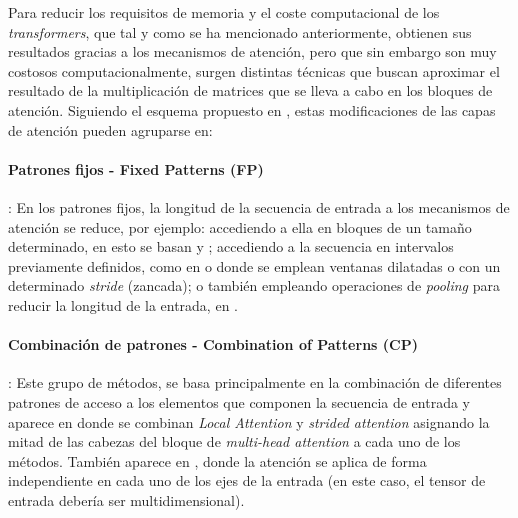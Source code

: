 Para reducir los requisitos de memoria y el coste computacional de los \textit{transformers}, que tal y como se ha mencionado anteriormente, obtienen sus resultados gracias a los mecanismos de atención, pero que sin embargo son muy costosos computacionalmente, surgen distintas técnicas que buscan aproximar el resultado de la multiplicación de matrices que se lleva a cabo en los bloques de atención. Siguiendo el esquema propuesto en \cite{2020arXiv200906732T}, estas modificaciones de las capas de atención pueden agruparse en:

\paragraph{Patrones fijos - Fixed Patterns (FP)}:
En los patrones fijos, la longitud de la secuencia de entrada a los mecanismos de atención se reduce, por ejemplo: accediendo a ella en bloques de un tamaño determinado, en esto se basan  \cite{qiu-etal-2020-blockwise} y  \cite{localattention}; accediendo a la secuencia en intervalos previamente definidos, como en  \cite{sparse-transformers} o  \cite{beltagy2020longformer} donde se emplean ventanas dilatadas o con un determinado \textit{stride} (zancada); o también empleando operaciones de \textit{pooling} para reducir la longitud de la entrada, en  \cite{j.2018generating}.

\paragraph{Combinación de patrones - Combination of Patterns (CP)}:
Este grupo de métodos, se basa principalmente en la combinación de diferentes patrones de acceso a los elementos que componen la secuencia de entrada y aparece en  \cite{sparse-transformers} donde se combinan \textit{Local Attention} y \textit{strided attention} asignando la mitad de las cabezas del bloque de \textit{multi-head attention} a cada uno de los métodos. También aparece en  \cite{ho2019axial}, donde la atención se aplica de forma independiente en cada uno de los ejes de la entrada (en este caso, el tensor de entrada debería ser multidimensional).


